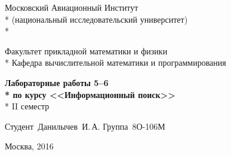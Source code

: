 \begin{titlepage}

\newpage

\begin{center}
Московский Авиационный Институт \\*
(национальный исследовательский университет) \\*

\vspace{2em}

Факультет прикладной математики и физики \\*
Кафедра вычислительной математики и программирования

\vspace{20em}

\Large \textbf{Лабораторные работы 5--6 \\*
по курсу <<Информационный поиск>>} \\*
II семестр

\end{center}

\vspace{15em}

\hspace{30em}\vbox{
	\hbox{Студент Данилычев И.\,А.}
	\hbox{Группа 8О-106М}
}

\vspace{\fill}

\begin{center}
Москва, 2016
\end{center}

\end{titlepage}
